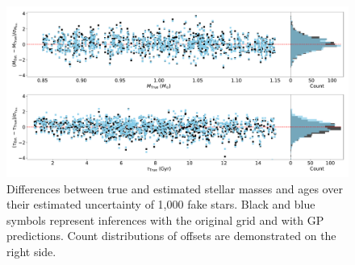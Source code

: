 \begin{figure}
	\includegraphics[width=1.8\columnwidth]{fake-stars-test-2.pdf}
    \caption{Differences between true and estimated stellar masses and ages over their estimated uncertainty of 1,000 fake stars. Black and blue symbols represent inferences with the original grid and with GP predictions. Count distributions of offsets are demonstrated on the right side.} 
  \label{fig:fake_test}
\end{figure}









